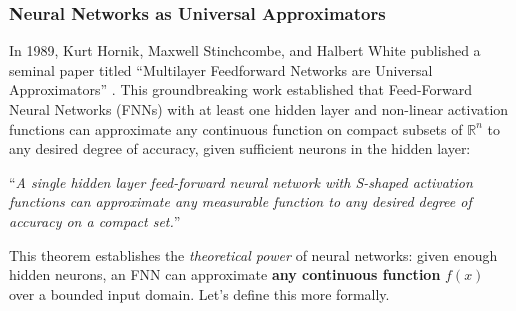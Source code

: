 \subsubsection{Neural Networks as Universal Approximators}

In 1989, Kurt Hornik, Maxwell Stinchcombe, and Halbert White published a seminal paper titled ``Multilayer Feedforward Networks are Universal Approximators'' \cite{HORNIK1989359}. This groundbreaking work established that Feed-Forward Neural Networks (FNNs) with at least one hidden layer and non-linear activation functions can approximate any continuous function on compact subsets of $\mathbb{R}^n$ to any desired degree of accuracy, given sufficient neurons in the hidden layer:

\begin{center}
    ``\emph{A single hidden layer feed-forward neural network with S-shaped activation functions can approximate any measurable function to any desired degree of accuracy on a compact set.}''
\end{center}

\noindent
This theorem establishes the \emph{theoretical power} of neural networks: given enough hidden neurons, an FNN can approximate \textbf{any continuous function} $f(x)$ over a bounded input domain. Let's define this more formally.

